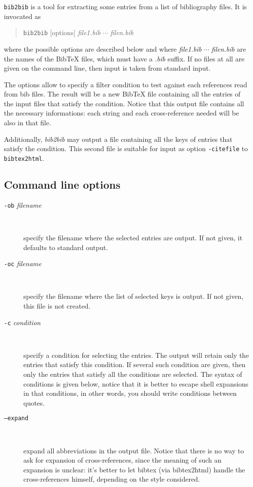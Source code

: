 \documentclass[11pt,a4paper]{article}
\begin{document}
\texttt{bib2bib} is a tool for extracting some entries from a list of
bibliography files. It is invocated as 
\begin{quote}
\texttt{bib2bib} [options] \textit{file1.bib} $\cdots$ \textit{filen.bib}
\end{quote}
where the possible options are described below and where
\textit{file1.bib} $\cdots$ \textit{filen.bib} are the names of the
BibTeX files, which must have a \textit{.bib} suffix. If no files at
all are given on the command line, then input is taken from standard
input. 

The options allow to specify a filter condition to test against each
references read from bib files. The result will be a new BibTeX file
containing all the entries of the input files that satisfy the
condition. Notice that this output file contains all the necessary
informations: each string and each cross-reference needed will be also
in that file.

Additionally, \textit{bib2bib} may output a file containing all the
keys of entries that satisfy the condition. This second file is
suitable for input as option \verb|-citefile| to \verb|bibtex2html|.

\subsection{Command line options}

\begin{description}
  
\item[\texttt{-ob} \textit{filename}] ~

  specify the filename where the selected entries are output. If not
  given, it defaults to standard output. 

\item[\texttt{-oc} \textit{filename}] ~

  specify the filename where the list of selected keys is output. If
  not given, this file is not created.

\item[\texttt{-c} \textit{condition}] ~

  specify a condition for selecting the entries. The output will
  retain only the entries that satisfy this condition. If several such
  condition are given, then only the entries that satisfy all the
  conditions are selected. The syntax of conditions is given below,
  notice that it is better to escape shell expansions in that
  conditions, in other words, you should write conditions between
  quotes. 

\item[\texttt{--expand}] ~

  expand all abbreviations in the output file. Notice that there is no
  way to ask for expansion of cross-references, since the meaning of
  such an expansion is unclear: it's better to let bibtex (via
  bibtex2html) handle the cross-references himself, depending on the
  style considered.

\end{description}
\end{document}
